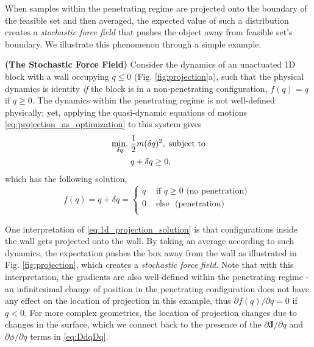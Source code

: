 When samples within the penetrating regime are projected onto the boundary of the feasible set and then averaged, the expected value of such a distribution creates a \emph{stochastic force field} that pushes the object away from feasible set's boundary. We illustrate this phenomenon through a simple example. 

\begin{example}\label{ex:projection}\normalfont\textbf{(The Stochastic Force Field)} Consider the dynamics of an unactuated 1D block with a wall occupying $q \leq 0$ (Fig. \ref{fig:projection}a), such that the physical dynamics is identity \emph{if} the block is in a non-penetrating configuration, $f(q)=q$ if $q\geq 0$. The dynamics within the penetrating regime is not well-defined physically; yet, applying the quasi-dynamic equations of motions \eqref{eq:projection_as_optimization} to this system gives 
\begin{subequations}
\label{eq:projection}
\begin{align}
\underset{\delta q}{\mathrm{min}.} \; &\frac{1}{2} m (\delta q)^2, \; \text{subject to} \\
& q + \delta q \geq 0.
\end{align}
\end{subequations}
which has the following solution,
\begin{equation}
\label{eq:1d_projection_solution}
f(q) = q + \delta q =  \begin{cases}
    q & \text{ if } q \geq 0  \text{ (no penetration) }\\
    0 & \text{ else } \text{ (penetration) }\\
\end{cases}
\end{equation}

One interpretation of \eqref{eq:1d_projection_solution} is that configurations inside the wall gets projected onto the wall. By taking an average according to such dynamics, the expectation pushes the box away from the wall as illustrated in Fig. \ref{fig:projection}, which creates a \emph{stochastic force field}. Note that with this interpretation, the gradients are also well-defined within the penetrating regime - an infinitesimal change of position in the penetrating configuration does not have any effect on the location of projection in this example, thus $\partial f(q)/\partial q=0$ if $q < 0$. For more complex geometries, the location of projection changes due to changes in the surface, which we connect back to the presence of the $\partial \mathbf{J}/\partial q$ and $\partial \phi/\partial q$ terms in \eqref{eq:DdqDq}.


\end{example}

